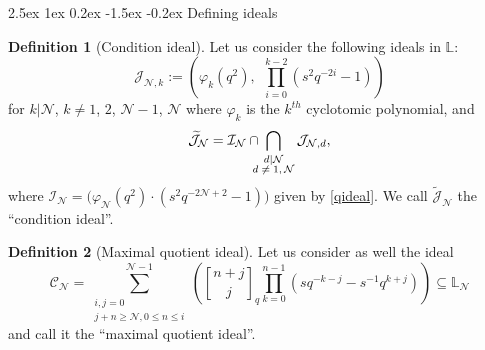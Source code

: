 \documentclass[reqno,a4paper,11pt]{amsart}
\makeatletter
\numberwithin{equation}{section}
\numberwithin{figure}{section}
\theoremstyle{definition}
\newtheorem{defn}{Definition}[section]
\theoremstyle{plain}
\renewcommand*{\subsection}{\@startsection{subsection}{2}{\z@}%
	{2.5ex \@plus 1ex \@minus 0.2ex}%
	{-1.5ex \@plus -0.2ex}%
	{\normalfont\normalsize\bfseries}}
\newcommand{\Liq}{\mathbb L}
\newcommand{\cC}{\mathcal{C}}
\newcommand{\cI}{\mathcal{I}}
\newcommand{\cJ}{\mathcal{J}}
\newcommand{\cN}{\mathcal{N}}
\renewcommand{\geq}{\geqslant}
\renewcommand{\leq}{\leqslant}
\makeatother
\begin{document}
\subsection{Defining ideals}
%
\begin{defn}[Condition ideal] 
\label{def:condition} 
Let us consider the following ideals in $\Liq$: 
%
%
\begin{equation*}
\cJ_{\cN,k}:=\left( \varphi_k(q^2),\  \ \prod_{i=0}^{k-2}(s^2q^{-2i}-1) \right)
\end{equation*}
for $k| \cN$, $k \neq 1$, $2$, $\cN-1$, $\cN$ where $\varphi_k$ is the $k^{th}$ cyclotomic polynomial, and
\begin{equation*}
\widetilde{\cJ}_\cN = \cI_\cN \cap\!\!\!\! \bigcap_{\text{\scriptsize$\begin{matrix}
d | \cN\\[-1pt]
d\neq 1, \cN
\end{matrix}$}} \cJ_{\cN,d},  
\end{equation*}
where $\cI_\cN = \Big( \varphi_\cN(q^2)\cdot (s^2q^{-2\cN+2}-1) \Big)$ given by \eqref{qideal}.  
We call $\widetilde{\cJ}_\cN$ the ``condition ideal''.
\end{defn}
%
%
\begin{defn}[Maximal quotient ideal]
\label{def:maximal}
Let us consider as well the ideal
\begin{equation}\label{idealb}
\cC_\cN = \sum_{\substack{i,j=0 \\ j+n\geq \cN,0\leq  n\leq i}}^{\cN-1}
 \left( {n+j \brack j}_q \prod_{k=0}^{n-1}(sq^{-k-j}-s^{-1}q^{k+j}) \right) \subseteq \Liq_{\cN}
\end{equation}
and call it the ``maximal quotient ideal''.
\end{defn}
%
\end{document}
